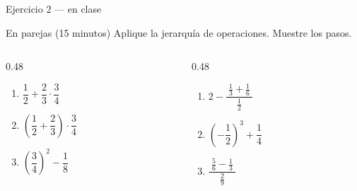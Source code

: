 \documentclass[aspectratio=169,10pt]{beamer}
\begin{document}
\begin{frame}{Ejercicio 2 — en clase}
  \begin{alertblock}{En parejas (15 minutos)}
    \scriptsize
    Aplique la jerarquía de operaciones. Muestre los pasos.

    \vspace{0.25cm}
    \begin{columns}[T,onlytextwidth]
      \begin{column}{0.48\textwidth}
        \begin{enumerate}\setlength{\itemsep}{0.22cm}
          \item $\dfrac{1}{2} + \dfrac{2}{3}\cdot\dfrac{3}{4}$
          \item $\left(\dfrac{1}{2} + \dfrac{2}{3}\right)\cdot\dfrac{3}{4}$
          \item $\left(\dfrac{3}{4}\right)^{2} - \dfrac{1}{8}$
        \end{enumerate}
      \end{column}
      \begin{column}{0.48\textwidth}
        \begin{enumerate}\setlength{\itemsep}{0.22cm}
          \setcounter{enumi}{3}
          \item $2 - \dfrac{\ \frac{1}{3}+\frac{1}{6}\ }{\ \frac{1}{2}\ }$
          \item $\left(-\dfrac{1}{2}\right)^{3} + \dfrac{1}{4}$
          \item $\dfrac{\ \frac{5}{6}-\frac{1}{3}\ }{\ \frac{2}{9}\ }$
        \end{enumerate}
      \end{column}
    \end{columns}
  \end{alertblock}
\end{frame}
\end{document}
